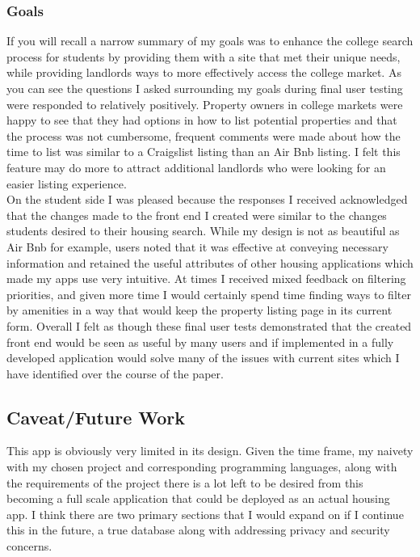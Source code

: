 \documentclass[10pt,twocolumn]{article}
\begin{document}
\subsubsection{Goals}
If you will recall a narrow summary of my goals was to enhance the college search process for students by providing them with a site that met their unique needs, while providing landlords ways to more effectively access the college market. As you can see the questions I asked surrounding my goals during final user testing were responded to relatively positively. Property owners in college markets were happy to see that they had options in how to list potential properties and that the process was not cumbersome, frequent comments were made about how the time to list was similar to a Craigslist listing than an Air Bnb listing. I felt this feature may do more to attract additional landlords who were looking for an easier listing experience.\\
On the student side I was pleased because the responses I received acknowledged that the changes made to the front end I created were similar to the changes students desired to their housing search.  While my design is not as beautiful as Air Bnb for example, users noted that it was effective at conveying necessary information and retained the useful attributes of other housing applications which made my apps use very intuitive. At times I received mixed feedback on filtering priorities, and given more time I would certainly spend time finding ways to filter by amenities in a way that would keep the property listing page in its current form. Overall I felt as though these final user tests demonstrated that the created front end would be seen as useful by many users and if implemented in a fully developed application would solve many of the issues with current sites which I have identified over the course of the paper. 

\subsection{Caveat/Future Work}
This app is obviously very limited in its design. Given the time frame, my naivety with my chosen project and corresponding programming languages, along with the requirements of the project there is a lot left to be desired from this becoming a full scale application that could be deployed as an actual housing app. I think there are two primary sections that I would expand on if I continue this in the future, a true database along with addressing privacy and security concerns.
\end{document}
